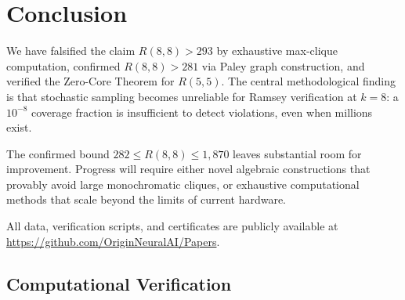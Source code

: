 \documentclass[12pt,a4paper]{article}
\theoremstyle{definition}
\theoremstyle{remark}
\begin{document}
\section{Conclusion}
\label{sec:conclusion}

We have falsified the claim $R(8,8) > 293$ by exhaustive max-clique computation, confirmed $R(8,8) > 281$ via Paley graph construction, and verified the Zero-Core Theorem for $R(5,5)$.  The central methodological finding is that stochastic sampling becomes unreliable for Ramsey verification at $k = 8$: a $10^{-8}$ coverage fraction is insufficient to detect violations, even when millions exist.

The confirmed bound $282 \le R(8,8) \le 1{,}870$ leaves substantial room for improvement.  Progress will require either novel algebraic constructions that provably avoid large monochromatic cliques, or exhaustive computational methods that scale beyond the limits of current hardware.

All data, verification scripts, and certificates are publicly available at \url{https://github.com/OriginNeuralAI/Papers}.

\subsection{Computational Verification}
\end{document}
